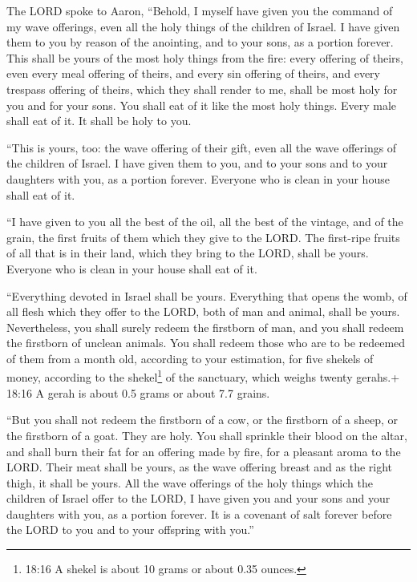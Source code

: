  The LORD spoke to Aaron, ``Behold, I myself have given you
the command of my wave offerings, even all the holy things of the
children of Israel. I have given them to you by reason of the anointing,
and to your sons, as a portion forever.  This shall be yours
of the most holy things from the fire: every offering of theirs, even
every meal offering of theirs, and every sin offering of theirs, and
every trespass offering of theirs, which they shall render to me, shall
be most holy for you and for your sons.  You shall eat of
it like the most holy things. Every male shall eat of it. It shall be
holy to you.

 ``This is yours, too: the wave offering of their gift,
even all the wave offerings of the children of Israel. I have given them
to you, and to your sons and to your daughters with you, as a portion
forever. Everyone who is clean in your house shall eat of it.

 ``I have given to you all the best of the oil, all the
best of the vintage, and of the grain, the first fruits of them which
they give to the LORD.  The first-ripe fruits of all that
is in their land, which they bring to the LORD, shall be yours. Everyone
who is clean in your house shall eat of it.

 ``Everything devoted in Israel shall be yours.
 Everything that opens the womb, of all flesh which they
offer to the LORD, both of man and animal, shall be yours. Nevertheless,
you shall surely redeem the firstborn of man, and you shall redeem the
firstborn of unclean animals.  You shall redeem those who
are to be redeemed of them from a month old, according to your
estimation, for five shekels of money, according to the
shekel\footnote{18:16 A shekel is about 10 grams or about 0.35 ounces.}
of the sanctuary, which weighs twenty gerahs.+ 18:16 A gerah is about
0.5 grams or about 7.7 grains.

 ``But you shall not redeem the firstborn of a cow, or the
firstborn of a sheep, or the firstborn of a goat. They are holy. You
shall sprinkle their blood on the altar, and shall burn their fat for an
offering made by fire, for a pleasant aroma to the LORD. 
Their meat shall be yours, as the wave offering breast and as the right
thigh, it shall be yours.  All the wave offerings of the
holy things which the children of Israel offer to the LORD, I have given
you and your sons and your daughters with you, as a portion forever. It
is a covenant of salt forever before the LORD to you and to your
offspring with you.''

